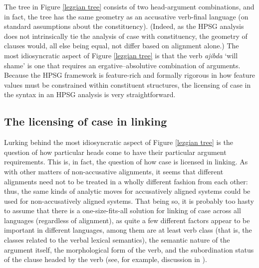 \documentclass[output=paper]{langsci/langscibook}
\begin{document}
{The tree in Figure \ref{lezgian tree} consists of two head-argument combinations, and in fact, the tree has the same geometry as an accusative verb-final language (on standard assumptions about the constituency). (Indeed, as the HPSG analysis does not intrinsically tie the analysis of case with constituency, the geometry of clauses would, all else being equal, not differ based on alignment alone.) The most idiosyncratic aspect of Figure \ref{lezgian tree} is that the verb \textit{ajibda} `will shame' is one that requires an ergative--absolutive combination of arguments. Because the HPSG framework is feature-rich and formally rigorous in how feature values must be constrained within constituent structures, the licensing of case in the syntax in an HPSG analysis is very straightforward.    	

\subsection{The licensing of case in linking}
 
Lurking behind the most idiosyncratic aspect of Figure \ref{lezgian tree} is the question of  how particular heads come to have their particular argument requirements. This is, in fact,  the question of how case is licensed in linking. As with other matters of non-accusative alignments, it seems that different alignments need not to be treated in a wholly different fashion from each other: thus, the same kinds of analytic moves for accusatively aligned systems could be used for non-accusatively aligned systems. That being so, it is probably too hasty to assume that there is a one-size-fits-all solution for linking of case across all languages (regardless of alignment), as quite a few different factors appear to be important in different languages, among them are at least verb class (that is, the classes related to the verbal lexical semantics), the semantic nature of the argument itself, the morphological form of the verb, and the subordination status of the clause headed by the verb (see, for example, discussion in \citealt{dixon94}).     

}
\end{document}
